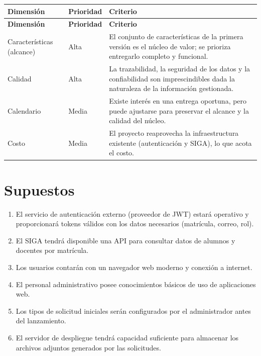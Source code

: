 \documentclass[12pt,letterpaper]{report}
\begin{document}
\begin{longtable}{|L{3.5cm}|L{4cm}|L{6cm}|}
    \hline
    \textbf{Dimensión} & \textbf{Prioridad} & \textbf{Criterio} \\
    \hline
    \endfirsthead
    \hline
    \textbf{Dimensión} & \textbf{Prioridad} & \textbf{Criterio} \\
    \hline
    \endhead
    \hline
    \endfoot

    Características (alcance) & Alta & El conjunto de características de la primera versión es el núcleo de valor; se prioriza entregarlo completo y funcional. \\
    \hline
    Calidad & Alta & La trazabilidad, la seguridad de los datos y la confiabilidad son imprescindibles dada la naturaleza de la información gestionada. \\
    \hline
    Calendario & Media & Existe interés en una entrega oportuna, pero puede ajustarse para preservar el alcance y la calidad del núcleo. \\
    \hline
    Costo & Media & El proyecto reaprovecha la infraestructura existente (autenticación y SIGA), lo que acota el costo. \\
    \hline
\end{longtable}

\section{Supuestos}

\begin{enumerate}
    \item El servicio de autenticación externo (proveedor de JWT) estará operativo y proporcionará tokens válidos con los datos necesarios (matrícula, correo, rol).
    \item El SIGA tendrá disponible una API para consultar datos de alumnos y docentes por matrícula.
    \item Los usuarios contarán con un navegador web moderno y conexión a internet.
    \item El personal administrativo posee conocimientos básicos de uso de aplicaciones web.
    \item Los tipos de solicitud iniciales serán configurados por el administrador antes del lanzamiento.
    \item El servidor de despliegue tendrá capacidad suficiente para almacenar los archivos adjuntos generados por las solicitudes.
\end{enumerate}
\end{document}
